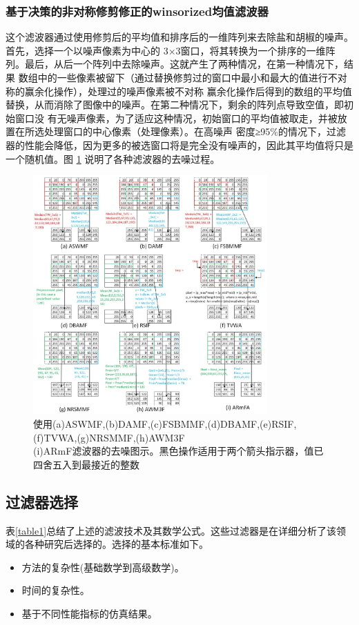 \documentclass[12pt]{article} %
\begin{document}
\subsubsection{基于决策的非对称修剪修正的winsorized均值滤波器}
这个滤波器通过使用修剪后的平均值和排序后的一维阵列来去除盐和胡椒的噪声\cite{ref27}。首先，选择一个以噪声像素为中心的
3×3窗口，将其转换为一个排序的一维阵列。最后，从后一个阵列中去除噪声。这就产生了两种情况，在第一种情况下，结果
数组中的一些像素被留下（通过替换修剪过的窗口中最小和最大的值进行不对称的赢余化操作），处理过的噪声像素被不对称
赢余化操作后得到的数组的平均值替换，从而消除了图像中的噪声。在第二种情况下，剩余的阵列点导致空值，即初始窗口没
有无噪声像素，为了适应这种情况，初始窗口的平均值被取走，并被放置在所选处理窗口的中心像素（处理像素）。在高噪声
密度≥95\%的情况下，过滤器的性能会降低，因为更多的被选窗口将是完全没有噪声的，因此其平均值将只是一个随机值。图
\ref{fig:mean} 说明了各种滤波器的去噪过程。
 
\begin{figure}[H]
    \centering
    \includegraphics[width=0.8\textwidth]{images/02.eps}
    \caption{使用(a)ASWMF,(b)DAMF,(c)FSBMMF,(d)DBAMF,(e)RSIF,(f)TVWA,(g)NRSMMF,(h)AWM3F\\
    (i)ARmF滤波器的去噪图示。黑色操作适用于两个箭头指示器，值已四舍五入到最接近的整数}
    \label{fig:mean}
\end{figure}

\subsection{过滤器选择}
表\ref{table1}总结了上述的滤波技术及其数学公式。这些过滤器是在详细分析了该领域的各种研究后选择的。选择的基本标准如下。
\begin{itemize}
    \item 方法的复杂性(基础数学到高级数学)。
    \item 时间的复杂性。
    \item 基于不同性能指标的仿真结果。
\end{itemize}
\end{document}
